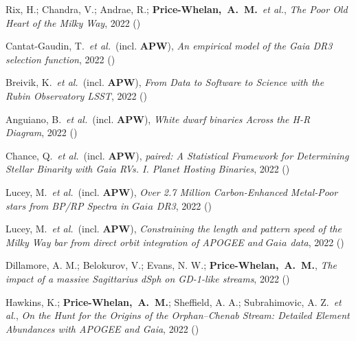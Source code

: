 \item[{\color{deemph}\scriptsize21}]Rix, H.; Chandra, V.; Andrae, R.; \textbf{Price-Whelan,~A.~M.}~\textit{et al.}, \textit{The Poor Old Heart of the Milky Way}, 2022 ()

\item[{\color{deemph}\scriptsize20}]Cantat-Gaudin, T.~\textit{et al.}~(incl. \textbf{APW}), \textit{An empirical model of the Gaia DR3 selection function}, 2022 ()

\item[{\color{deemph}\scriptsize19}]Breivik, K.~\textit{et al.}~(incl. \textbf{APW}), \textit{From Data to Software to Science with the Rubin Observatory LSST}, 2022 ()

\item[{\color{deemph}\scriptsize18}]Anguiano, B.~\textit{et al.}~(incl. \textbf{APW}), \textit{White dwarf binaries Across the H-R Diagram}, 2022 ()

\item[{\color{deemph}\scriptsize17}]Chance, Q.~\textit{et al.}~(incl. \textbf{APW}), \textit{paired: A Statistical Framework for Determining Stellar Binarity with Gaia RVs. I. Planet Hosting Binaries}, 2022 ()

\item[{\color{deemph}\scriptsize16}]Lucey, M.~\textit{et al.}~(incl. \textbf{APW}), \textit{Over 2.7 Million Carbon-Enhanced Metal-Poor stars from BP/RP Spectra in $Gaia$ DR3}, 2022 ()

\item[{\color{deemph}\scriptsize15}]Lucey, M.~\textit{et al.}~(incl. \textbf{APW}), \textit{Constraining the length and pattern speed of the Milky Way bar from direct orbit integration of APOGEE and $Gaia$ data}, 2022 ()

\item[{\color{deemph}\scriptsize14}]Dillamore, A. M.; Belokurov, V.; Evans, N. W.; \textbf{Price-Whelan,~A.~M.}, \textit{The impact of a massive Sagittarius dSph on GD-1-like streams}, 2022 ()

\item[{\color{deemph}\scriptsize13}]Hawkins, K.; \textbf{Price-Whelan,~A.~M.}; Sheffield, A. A.; Subrahimovic, A. Z.~\textit{et al.}, \textit{On the Hunt for the Origins of the Orphan--Chenab Stream: Detailed Element Abundances with APOGEE and Gaia}, 2022 ()

